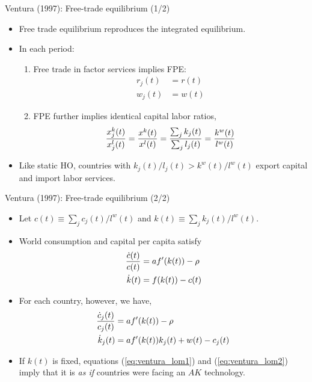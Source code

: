\documentclass[10pt,notes=hide]{beamer}
\begin{document}
\begin{frame}{Ventura (1997): Free-trade equilibrium (1/2)}
\begin{itemize}
\item Free trade equilibrium reproduces the integrated equilibrium.
\item In each period:
	\begin{enumerate}
	\item Free trade in factor services implies FPE:
	\begin{align*}
	r_j (t) &= r(t) \\ 
	w_j(t) &= w(t)
	\end{align*}
	\item FPE further implies identical capital labor ratios,
	\[
	{ x^k_j(t) \over x^l_j(t) } = { x^k(t) \over x^l(t) } = { \sum_j k_j(t) \over \sum_j l_j(t) } = { k^w(t) \over l^w(t) }
	\]
	\end{enumerate}
\item Like static HO, countries with $ k_j(t)/ l_j(t) > k^w(t) / l^w(t) $ export capital and import labor services.
\end{itemize}
\end{frame}
\begin{frame}{Ventura (1997): Free-trade equilibrium (2/2)}
\begin{itemize}
\item Let $c(t) \equiv \sum_j c_j(t) / l^w(t)$ and $k(t) \equiv \sum_j k_j(t) / l^w(t) $.
\item World consumption and capital per capita satisfy
	\begin{align*}
	{ \dot c(t) \over c(t) } &= a f'( k(t) ) - \rho \\
	\dot k(t) &= f(k(t)) - c(t)
	\end{align*}
\item For each country, however, we have,
	\begin{align}
	{ \dot c_j(t) \over c_j(t) } &= a f'(k(t)) - \rho \label{eq:ventura_lom1} \\
	\dot k_j(t) &= a f'(k(t)) k_j(t) + w(t) - c_j(t) \label{eq:ventura_lom2} 
	\end{align}
\item If $k(t)$ is fixed, equations (\ref{eq:ventura_lom1}) and (\ref{eq:ventura_lom2}) imply that it is \emph{as if} countries were facing an $AK$ technology.
\end{itemize}
\end{frame}
\end{document}

